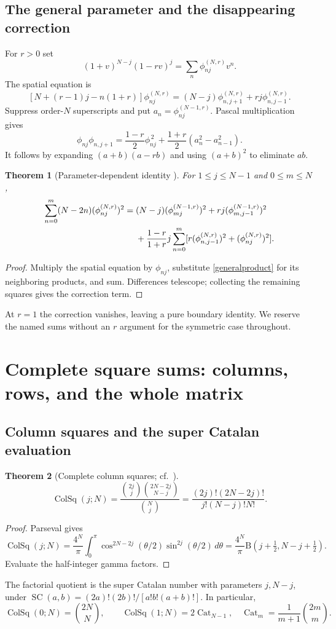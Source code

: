 \documentclass[11pt,reqno]{amsart}
\newtheorem{theorem}{Theorem}[section]
\theoremstyle{remark}\newtheorem{remark}[theorem]{Remark}
\newcommand{\Cat}{\operatorname{Cat}}
\DeclareMathOperator{\ColSq}{ColSq}
\begin{document}
\subsection{The general parameter and the disappearing correction}
For $r>0$ set
\[
(1+v)^{N-j}(1-rv)^j=\sum_n\phi_{nj}^{(N,r)}v^n.
\]
The spatial equation is
\[
[N+(r-1)j-n(1+r)]\phi_{nj}^{(N,r)}
=(N-j)\phi_{n,j+1}^{(N,r)}+rj\phi_{n,j-1}^{(N,r)}.
\]
Suppress order-$N$ superscripts and put $a_n=\phi_{nj}^{(N-1,r)}$. Pascal multiplication gives
\begin{equation}\label{generalproduct}
\phi_{nj}\phi_{n,j+1}=\frac{1-r}{2}\phi_{nj}^{\,2}
+\frac{1+r}{2}(a_n^2-a_{n-1}^2).
\end{equation}
It follows by expanding $(a+b)(a-rb)$ and using $(a+b)^2$ to eliminate $ab$.
\begin{theorem}[Parameter-dependent identity \cite{Feinsilver2016}]
For $1\le j\le N-1$ and $0\le m\le N$,
\begin{align}\label{generalsquare}
\sum_{n=0}^m(N-2n)(\phi_{nj}^{(N,r)})^2
={}&(N-j)(\phi_{mj}^{(N-1,r)})^2+rj(\phi_{m,j-1}^{(N-1,r)})^2\notag\\
&+\frac{1-r}{1+r}j\sum_{n=0}^m
[r(\phi_{n,j-1}^{(N,r)})^2+(\phi_{nj}^{(N,r)})^2].
\end{align}
\end{theorem}
\begin{proof}
Multiply the spatial equation by $\phi_{nj}$, substitute \eqref{generalproduct} for its neighboring products, and sum. Differences telescope; collecting the remaining squares gives the correction term.
\end{proof}
At $r=1$ the correction vanishes, leaving a pure boundary identity. We reserve the named sums without an $r$ argument for the symmetric case throughout.

\section{Complete square sums: columns, rows, and the whole matrix}\label{sec:complete}
\subsection{Column squares and the super Catalan evaluation}
\begin{theorem}[Complete column squares; cf.\ \cite{Feinsilver2016}]\label{columnsquares}
\begin{equation}\label{ColSqExact}
\boxed{\ColSq(j;N)=
\frac{\binom{2j}{j}\binom{2N-2j}{N-j}}{\binom Nj}
=\frac{(2j)!(2N-2j)!}{j!(N-j)!N!}.}
\end{equation}
\end{theorem}
\begin{proof}
Parseval gives
\[
\ColSq(j;N)=\frac{4^N}{\pi}\int_0^\pi
\cos^{2N-2j}(\theta/2)\sin^{2j}(\theta/2)\,d\theta
=\frac{4^N}{\pi}\mathrm B(j+\tfrac12,N-j+\tfrac12).
\]
Evaluate the half-integer gamma factors.
\end{proof}
The factorial quotient is the super Catalan number with parameters $j,N-j$, under $\operatorname{SC}(a,b)=(2a)!(2b)!/[a!b!(a+b)!]$. In particular,
\[
\ColSq(0;N)=\binom{2N}{N},\qquad
\ColSq(1;N)=2\Cat_{N-1},\quad
\Cat_m=\frac1{m+1}\binom{2m}{m}.
\]
\end{document}
